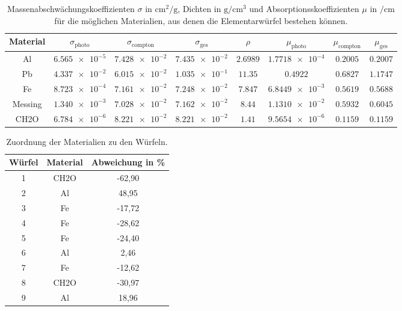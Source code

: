 \begin{table}[htp]
	\begin{center}
    \caption{Massenabschwächungskoeffizienten $\sigma$ in $\si{\centi\meter\squared\per\gram}$, Dichten in $\si{\gram\per\centi\meter\cubed}$ und Absorptionsskoeffizienten $\mu$ in $\si{\per\centi\meter}$ für die möglichen Materialien, aus denen die Elementarwürfel bestehen können.}
    \label{tab:dicke}
		\begin{tabular}{cccccccc}
		\toprule
			Material & $\sigma_{\text{photo}}$ & $\sigma_{\text{compton}}$ & $\sigma_{\text{ges}}$ & $\rho$ & $\mu_{\text{photo}}$ & $\mu_{\text{compton}}$ & $\mu_{\text{ges}}$\\
			\midrule
			Al & $\num{6.565e-5}$ & $\num{7.428e-2}$ & $\num{7.435e-2}$ & $\num{2.6989}$ & $\num{1.7718e-4}$ & $\num{0.2005}$ & $\num{0.2007}$\\
      Pb & $\num{4.337e-2}$ & $\num{6.015e-2}$ & $\num{1.035e-1}$ & $\num{11.35}$ & $\num{0.4922}$ & $\num{0.6827}$ & $\num{1.1747}$\\
      Fe & $\num{8.723e-4}$ & $\num{7.161e-2}$ & $\num{7.248e-2}$ & $\num{7.847}$ & $\num{6.8449e-3}$ & $\num{0.5619}$ & $\num{0.5688}$\\
      Messing & $\num{1.340e-3}$ & $\num{7.028e-2}$ & $\num{7.162e-2}$ & $\num{8.44}$ & $\num{1.1310e-2}$ & $\num{0.5932}$ & $\num{0.6045}$\\
      CH2O & $\num{6.784e-6}$ & $\num{8.221e-2}$ & $\num{8.221e-2}$ & $\num{1.41}$ & $\num{9.5654e-6}$ & $\num{0.1159}$ & $\num{0.1159}$\\
		\bottomrule
		\end{tabular}
	\end{center}
\end{table}

\begin{table}[htp]
	\begin{center}
    \caption{Zuordnung der Materialien zu den Würfeln.}
    \label{tab:ergebnisse2}
		\begin{tabular}{ccc}
		\toprule
			{Würfel} & {Material}  & {Abweichung in \%} \\
			\midrule
			1 & CH2O &   -62,90 \\
			2 & Al   &   48,95\\
			3 & Fe   &   -17,72\\
			4 & Fe   &   -28,62\\
			5 & Fe   &   -24,40\\
			6 & Al   &   2,46 \\
			7 & Fe   &   -12,62\\
			8 & CH2O &   -30,97 \\
			9 & Al   &   18,96\\
		\bottomrule
		\end{tabular}
	\end{center}
\end{table}
